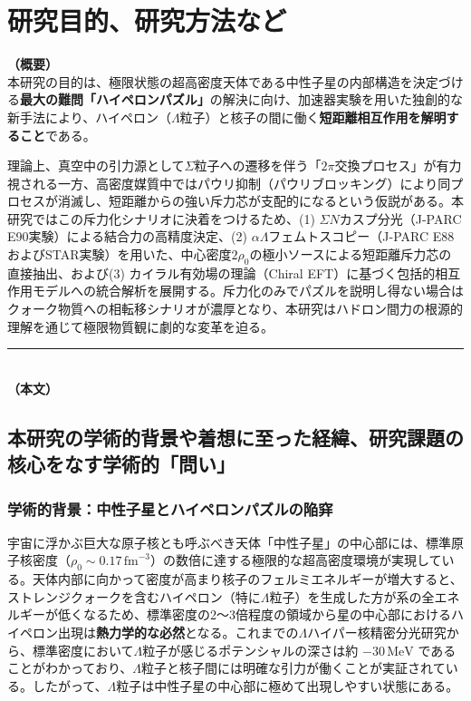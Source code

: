 \documentclass[11pt,a4j,dvipdfmx]{jarticle} 					%
\newcommand{\研究課題名}{加速器実験による短距離バリオン間相互作用の解明と中性子星ハイペロンパズルの解決}
\newcommand{\研究機関名}{東北大学}
\newcommand{\研究代表者氏名}{市川裕大}
\newcommand{\研究期間の最終元号年度}{13}
\begin{document}

\section{研究目的、研究方法など}

\noindent
\textbf{（概要）}\\
	本研究の目的は、極限状態の超高密度天体である中性子星の内部構造を決定づける\textbf{最大の難問「ハイペロンパズル」}の解決に向け、加速器実験を用いた独創的な新手法により、ハイペロン（$\Lambda$粒子）と核子の間に働く\textbf{短距離相互作用を解明すること}である。
	
	理論上、真空中の引力源として$\Sigma$粒子への遷移を伴う「$2\pi$交換プロセス」が有力視される一方、高密度媒質中ではパウリ抑制（パウリブロッキング）により同プロセスが消滅し、短距離からの強い斥力芯が支配的になるという仮説がある。本研究ではこの斥力化シナリオに決着をつけるため、(1) $\Sigma N$カスプ分光（J-PARC E90実験）による結合力の高精度決定、(2) $\alpha\Lambda$フェムトスコピー（J-PARC E88およびSTAR実験）を用いた、中心密度$2\rho_0$の極小ソースによる短距離斥力芯の直接抽出、および(3) カイラル有効場の理論（Chiral EFT）に基づく包括的相互作用モデルへの統合解析を展開する。斥力化のみでパズルを説明し得ない場合はクォーク物質への相転移シナリオが濃厚となり、本研究はハドロン間力の根源的理解を通じて極限物質観に劇的な変革を迫る。
	
	\vspace*{1zw}

\noindent
\rule{\linewidth}{1pt}\\
\noindent
\textbf{（本文）}\\
\subsection{本研究の学術的背景や着想に至った経緯、研究課題の核心をなす学術的「問い」}
\subsubsection{学術的背景：中性子星とハイペロンパズルの陥穽}
宇宙に浮かぶ巨大な原子核とも呼ぶべき天体「中性子星」の中心部には、標準原子核密度（$\rho_0 \sim 0.17\,\text{fm}^{-3}$）の数倍に達する極限的な超高密度環境が実現している。天体内部に向かって密度が高まり核子のフェルミエネルギーが増大すると、ストレンジクォークを含むハイペロン（特に$\Lambda$粒子）を生成した方が系の全エネルギーが低くなるため、標準密度の2〜3倍程度の領域から星の中心部におけるハイペロン出現は\textbf{熱力学的な必然}となる。これまでの$\Lambda$ハイパー核精密分光研究から、標準密度において$\Lambda$粒子が感じるポテンシャルの深さは約 $-30\,\text{MeV}$ であることがわかっており、$\Lambda$粒子と核子間には明確な引力が働くことが実証されている。したがって、$\Lambda$粒子は中性子星の中心部に極めて出現しやすい状態にある。
\end{document}
